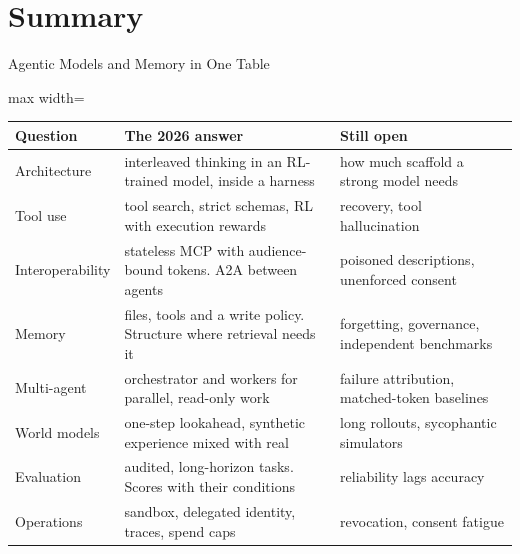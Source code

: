 \section{Summary}

\begin{frame}{Agentic Models and Memory in One Table}
    \begin{center}
    \footnotesize
    \renewcommand{\arraystretch}{1.0}
    \begin{adjustbox}{max width=\linewidth}\begin{tabular}{>{\raggedright\arraybackslash}p{2.5cm}>{\raggedright\arraybackslash}p{5.4cm}>{\raggedright\arraybackslash}p{5.4cm}}
        \toprule
        \textbf{Question} & \textbf{The 2026 answer} & \textbf{Still open} \\
        \midrule
        Architecture & interleaved thinking in an RL-trained model, inside a harness & how much scaffold a strong model needs \\
        Tool use & tool search, strict schemas, RL with execution rewards & recovery, tool hallucination \\
        Interoperability & stateless MCP with audience-bound tokens. A2A between agents & poisoned descriptions, unenforced consent \\
        Memory & files, tools and a write policy. Structure where retrieval needs it & forgetting, governance, independent benchmarks \\
        Multi-agent & orchestrator and workers for parallel, read-only work & failure attribution, matched-token baselines \\
        World models & one-step lookahead, synthetic experience mixed with real & long rollouts, sycophantic simulators \\
        Evaluation & audited, long-horizon tasks. Scores with their conditions & reliability lags accuracy \\
        Operations & sandbox, delegated identity, traces, spend caps & revocation, consent fatigue \\
        \bottomrule
    \end{tabular}\end{adjustbox}
    \end{center}
    \vspace{0.1em}
\end{frame}

